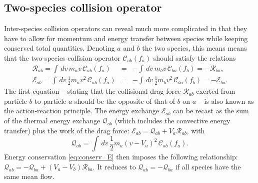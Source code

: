 \documentclass[11pt]{article}
\begin{document}
\subsection{Two-species collision operator}\label{sec:two_species}
Inter-species collision operators can reveal much more complicated in that they have to allow for momentum and energy transfer between species while keeping conserved total quantities. Denoting $a$ and $b$ the two species, this means means that the two-species collision operator $\mathcal{C}_{ab}(f_a)$ should satisfy the relations
%
\begin{eqnarray}
\mathcal{R}_{ab} = \int \,d v\, m_av\, \mathcal{C}_{ab}(f_a) &=& - \int \,d v\, m_bv\, \mathcal{C}_{ba}(f_b) = -\mathcal{R}_{ba} \label{eq:conserv_R}, \\
\mathcal{E}_{ab} = \int \,d v\,  \frac{1}{2}m_av^2\, \mathcal{C}_{ab}(f_a) &=& - \int \,d v\, \frac{1}{2}m_bv^2\, \mathcal{C}_{ba}(f_b) = -\mathcal{E}_{ba}  \label{eq:conserv_E}.
\end{eqnarray}
%
The first equation -- stating that the collisional drag force $\mathcal{R}_{ab}$ exerted from particle $b$ to particle $a$ should be the opposite of that of $b$ on $a$ -- is also known as the action-reaction principle. The energy exchange $\mathcal{E}_{ab}$ can be recast as the sum of the thermal energy exchange $\mathcal{Q}_{ab}$ (which includes the convective energy transfer) plus the work of the drag force: $\mathcal{E}_{ab} = \mathcal{Q}_{ab} + V_a \mathcal{R}_{ab}$, with
%
\begin{equation}  \label{eq:def_Q}
\mathcal{Q}_{ab} = \int \,d v\,  \frac{1}{2}m_a(v-V_a)^2\, \mathcal{C}_{ab}(f_a).
\end{equation} 
%
Energy conservation \eqref{eq:conserv_E} then imposes the following relationship: $\mathcal{Q}_{ab} = -\mathcal{Q}_{ba} + (V_a-V_b)\mathcal{R}_{ba}$. It reduces to $\mathcal{Q}_{ab} = -\mathcal{Q}_{ba}$ if all species have the same mean flow. 

\vspace{5mm}
\end{document}
